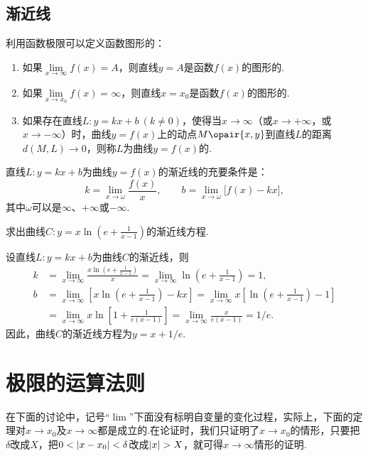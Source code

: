 \subsection{渐近线}
\begin{definition}
利用函数极限可以定义函数图形的：\begin{enumerate}
\item 如果\(\lim\limits_{x \to \infty}f(x) = A\)，则直线\(y = A\)是函数\(f(x)\)的图形的.
\item 如果\(\lim\limits_{x \to x_0}f(x) = \infty\)，则直线\(x = x_0\)是函数\(f(x)\)的图形的.
\item 如果存在直线\(L: y = kx+b\ (k \neq 0)\)，使得当\(x \to \infty\)（或\(x \to +\infty\)，或\(x \to -\infty\)）时，曲线\(y = f(x)\)上的动点\(M\opair{x,y}\)到直线\(L\)的距离\(d(M,L)\to0\)，则称\(L\)为曲线\(y = f(x)\)的.
\end{enumerate}
\end{definition}

\begin{theorem}
直线\(L: y = kx+b\)为曲线\(y = f(x)\)的渐近线的充要条件是：\[
k = \lim\limits_{x \to \omega} \frac{f(x)}{x},
\qquad
b = \lim\limits_{x \to \omega} \bigl[ f(x) - kx \bigr],
\]其中\(\omega\)可以是\(\infty\)、\(+\infty\)或\(-\infty\).
\end{theorem}

\begin{example}
求出曲线\(C: y = x \ln\left(e+\frac{1}{x-1}\right)\)的渐近线方程.
\begin{solution}
设直线\(L: y = kx+b\)为曲线\(C\)的渐近线，则\begin{align*}
k &= \lim\limits_{x\to\infty} \frac{x \ln\left(e+\frac{1}{x-1}\right)}{x}
= \lim\limits_{x\to\infty} \ln\left(e+\frac{1}{x-1}\right)
= 1, \\
b &= \lim\limits_{x\to\infty} \left[ x \ln\left(e+\frac{1}{x-1}\right) - kx \right]
= \lim\limits_{x\to\infty} x \left[ \ln\left(e+\frac{1}{x-1}\right) - 1 \right] \\
&= \lim\limits_{x\to\infty} x \ln\left[1+\frac{1}{e(x-1)}\right]
= \lim\limits_{x\to\infty} \frac{x}{e(x-1)}
= 1/e.
\end{align*}
因此，曲线\(C\)的渐近线方程为\(y = x + 1/e\).
\end{solution}
\end{example}

\section{极限的运算法则}
在下面的讨论中，记号“\(\lim\)”下面没有标明自变量的变化过程，实际上，下面的定理对\(x \to x_0\)及\(x \to \infty\)都是成立的.在论证时，我们只证明了\(x \to x_0\)的情形，只要把\(\delta\)改成\(X\)，把\(0<\abs{x-x_0}<\delta\)改成\(\abs{x}>X\)，就可得\(x \to \infty\)情形的证明.

